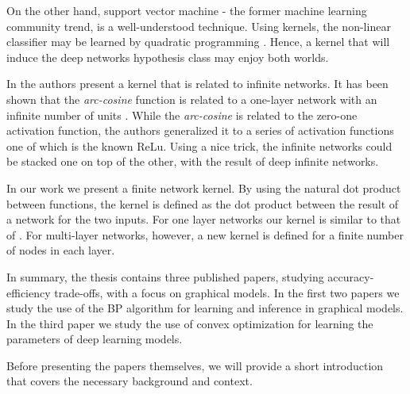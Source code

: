  
On the other hand, support vector machine - the former machine learning community trend, is a well-understood technique.
Using kernels, the non-linear classifier may be learned by quadratic programming \cite{scholkopf2002learning}.
Hence, a kernel that will induce the deep networks hypothesis class may enjoy both worlds.

In  \cite{cho2009kernel} the authors present a kernel that is related to infinite networks.
It has been shown that the \textit{arc-cosine} function is related to a one-layer network with an infinite number of units  \cite{williams1998computation}.
While the \textit{arc-cosine} is related to the zero-one activation function, the authors generalized it to a series of activation functions one of which is the known ReLu.
Using a nice trick, the infinite networks could be stacked one on top of the other, with the result of deep infinite networks.

In our work  \cite{heinemann2016improper} we present a finite network kernel.
By using the natural dot product between functions, the kernel is defined as the dot product between the result of a network for the two inputs.
For one layer networks our kernel is similar to that of  \cite{cho2009kernel}.
For multi-layer networks, however, a new kernel is defined for a finite number of nodes in each layer.

In summary, the thesis contains three published papers, studying accuracy-efficiency trade-offs, with a focus on graphical models. In the first two papers we study the use of the BP algorithm for learning and inference in graphical models. In the third paper we study the use of convex optimization for learning the parameters of deep learning models. 

Before presenting the papers themselves, we will provide a short introduction that covers the necessary background and context.
 

